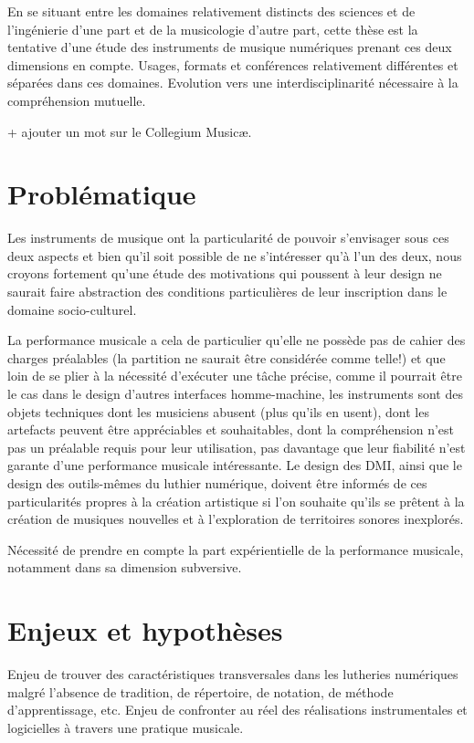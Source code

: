 En se situant entre les domaines relativement distincts des sciences et de l'ingénierie d'une part et de la musicologie d'autre part, cette thèse est la tentative d'une étude des instruments de musique numériques prenant ces deux dimensions en compte.
Usages, formats et conférences relativement différentes et séparées dans ces domaines. 
Evolution vers une interdisciplinarité nécessaire à la compréhension mutuelle.

+ ajouter un mot sur le Collegium Musicæ.

\section{Problématique}

Les instruments de musique ont la particularité de pouvoir s'envisager sous ces deux aspects et bien qu'il soit possible de ne s'intéresser qu'à l'un des deux, nous croyons fortement qu'une étude des motivations qui poussent à leur design ne saurait faire abstraction des conditions particulières de leur inscription dans le domaine socio-culturel.

La performance musicale a cela de particulier qu'elle ne possède pas de cahier des charges préalables (la partition ne saurait être considérée comme telle!) et que loin de se plier à la nécessité d'exécuter une tâche précise, comme il pourrait être le cas dans le design d'autres interfaces homme-machine, les instruments sont des objets techniques dont les musiciens abusent (plus qu'ils en usent), dont les artefacts peuvent être appréciables et souhaitables, dont la compréhension n'est pas un préalable requis pour leur utilisation, pas davantage que leur fiabilité n'est garante d'une performance musicale intéressante.
%
Le design des DMI, ainsi que le design des outils-mêmes du luthier numérique, doivent être informés de ces particularités propres à la création artistique si l'on souhaite qu'ils se prêtent à la création de musiques nouvelles et à l'exploration de territoires sonores inexplorés.

Nécessité de prendre en compte la part expérientielle de la performance musicale, notamment dans sa dimension subversive.

\section{Enjeux et hypothèses}

Enjeu de trouver des caractéristiques transversales dans les lutheries numériques malgré l'absence de tradition, de répertoire, de notation, de méthode d'apprentissage, etc.
Enjeu de confronter au réel des réalisations instrumentales et logicielles à travers une pratique musicale.

